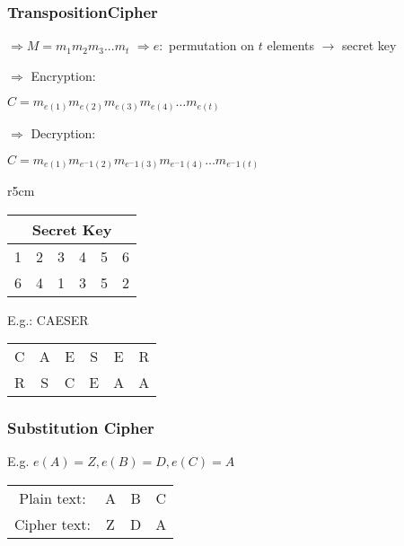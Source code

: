 \documentclass[11pt]{article}
\begin{document}
	\subsubsection{TranspositionCipher}
	$\Rightarrow M = m_1 m_2 m_3 ... m_t$ \newline
	$\Rightarrow e:$ permutation on $t$ elements $\rightarrow$ secret key \newline \break
	\begin{Large}
		$\Rightarrow$ Encryption: \newline \break
	\end{Large}
	$C = m_{e(1)} m_{e(2)} m_{e(3)} m_{e(4)} \dots m_{e(t)}$ \newline \break
	
	\begin{Large}
		$\Rightarrow$ Decryption: \newline \break
	\end{Large}
	$C = m_{e(1)} m_{e^-1 (2)} m_{e^-1 (3)} m_{e^-1 (4)} \dots  m_{e^-1 (t)}$ \newline
	
	
	\begin{wraptable}{r}{5cm}
		\begin{tabular}{ |c|c|c|c|c|c| }
			\hline
			\multicolumn{6}{|c|}{Secret Key} \\
			\hline
			1 & 2 & 3 & 4 & 5 & 6 \\ 
			6 & 4 & 1 & 3 & 5 & 2  \\
			\hline 
		\end{tabular}
	\end{wraptable}
	E.g.: CAESER \newline \break
	\begin{tabular}{ |c|c|c|c|c|c| }
		\hline
		C & A & E & S & E & R \\ 
		R & S & C & E & A & A \\
		\hline 
	\end{tabular}
	
	\subsubsection{Substitution Cipher}
	
	
	E.g. $e(A) = Z, e(B) = D, e(C) = A$ \newline \break
	\begin{tabular}{ |c|c|c|c| }
		\hline
		Plain text: & A & B & C \\ 
		Cipher text: & Z & D & A  \\
		\hline 
	\end{tabular}
	
\end{document}
